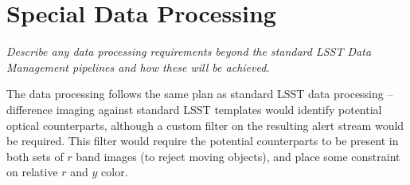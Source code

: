 \documentclass[11pt]{article}
\begin{document}
\section{Special Data Processing}
\begin{footnotesize}
{\it Describe any data processing requirements beyond the standard LSST Data Management pipelines and how these will be achieved.}
\end{footnotesize}

The data processing follows the same plan as standard LSST data processing -- difference imaging against standard LSST templates would identify potential optical counterparts, although a custom filter on the resulting alert stream would be required. This filter would require the potential counterparts to be present in
both sets of $r$ band images (to reject moving objects), and place some constraint on relative $r$ and $y$ color. 
\end{document}

